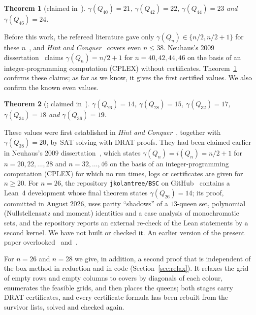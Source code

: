 \documentclass[11pt]{article}
\newtheorem{theorem}{Theorem}[section]
\theoremstyle{definition}
\theoremstyle{remark}
\begin{document}
\begin{theorem}[claimed in~\cite{Neuhaus}]\label{thm:new}
$\gamma(Q_{40})=21$, $\gamma(Q_{42})=22$, $\gamma(Q_{44})=23$ and $\gamma(Q_{46})=24$.
\end{theorem}

Before this work, the refereed literature gave only $\gamma(Q_n)\in\{n/2,n/2+1\}$ for these
$n$~\cite{OW,Weakley2022}, and \emph{Hint and Conquer}~\cite{HC} covers even $n\le38$. Neuhaus's 2009
dissertation~\cite{Neuhaus} claims $\gamma(Q_n)=n/2+1$ for $n=40,42,44,46$ on the basis of an
integer-programming computation (CPLEX) without certificates. Theorem~\ref{thm:new} confirms these
claims; as far as we know, it gives the first certified values. We also confirm the known even values.

\begin{theorem}[\cite{HC}; claimed in~\cite{Neuhaus}]\label{thm:even}
$\gamma(Q_{26})=14$, $\gamma(Q_{28})=15$, $\gamma(Q_{32})=17$, $\gamma(Q_{34})=18$ and $\gamma(Q_{36})=19$.
\end{theorem}

These values were first established in \emph{Hint and Conquer}~\cite{HC}, together with
$\gamma(Q_{38})=20$, by SAT solving with DRAT proofs. They had been claimed earlier in Neuhaus's 2009
dissertation~\cite{Neuhaus}, which states $\gamma(Q_n)=i(Q_n)=n/2+1$ for $n=20,22,\dots,28$ and
$n=32,\dots,46$ on the basis of an integer-programming computation (CPLEX) for which no run times, logs
or certificates are given for $n\ge20$. For $n=26$, the repository \texttt{jkolantree/BSC} on
GitHub~\cite{BSC} contains a Lean~4 development whose final theorem states $\gamma(Q_{26})=14$; its
proof, committed in August 2026, uses parity ``shadows'' of a $13$-queen set, polynomial (Nullstellensatz
and moment) identities and a case analysis of monochromatic sets, and the repository reports an external
re-check of the Lean statements by a second kernel. We have not built or checked it. An earlier version of
the present paper overlooked~\cite{HC} and~\cite{Neuhaus}.

For $n=26$ and $n=28$ we give, in addition, a second proof that is independent of the box method in
reduction and in code (Section~\ref{sec:relax}). It relaxes the grid of empty rows and empty columns to
covers by diagonals of each colour, enumerates the feasible grids, and then places the queens; both
stages carry DRAT certificates, and every certificate formula has been rebuilt from the survivor lists,
solved and checked again.
\end{document}
